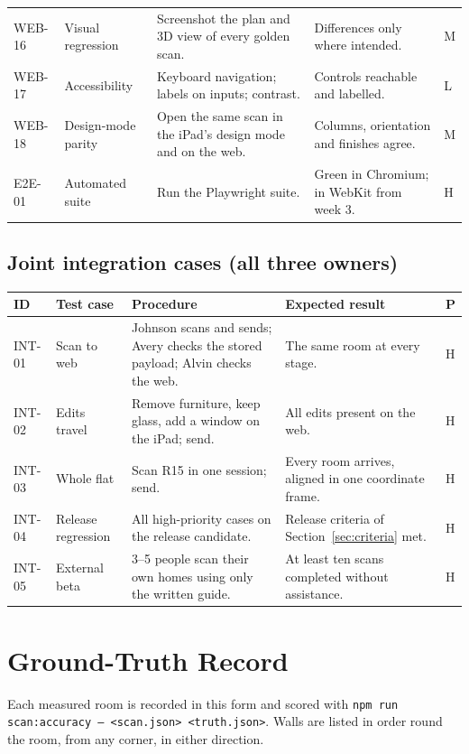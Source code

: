 \documentclass[conference,a4paper,10pt]{IEEEtran}
\begin{document}
\begin{longtable}{@{}L{1.25cm}L{3.6cm}L{5.4cm}L{5.1cm}C{0.4cm}@{}}
WEB-16 & Visual regression & Screenshot the plan and 3D view of every golden scan. & Differences only where intended. & M \\
WEB-17 & Accessibility & Keyboard navigation; labels on inputs; contrast. & Controls reachable and labelled. & L \\
WEB-18 & Design-mode parity & Open the same scan in the iPad's design mode and on the web. & Columns, orientation and finishes agree. & M \\
E2E-01 & Automated suite & Run the Playwright suite. & Green in Chromium; in WebKit from week 3. & H \\
\end{longtable}

\subsection{Joint integration cases (all three owners)}

\begin{longtable}{@{}L{1.25cm}L{3.6cm}L{5.4cm}L{5.1cm}C{0.4cm}@{}}
\toprule
ID & Test case & Procedure & Expected result & P \\
\midrule
\endhead
\bottomrule
\endfoot
INT-01 & Scan to web & Johnson scans and sends; Avery checks the stored payload; Alvin checks the web. & The same room at every stage. & H \\
INT-02 & Edits travel & Remove furniture, keep glass, add a window on the iPad; send. & All edits present on the web. & H \\
INT-03 & Whole flat & Scan R15 in one session; send. & Every room arrives, aligned in one coordinate frame. & H \\
INT-04 & Release regression & All high-priority cases on the release candidate. & Release criteria of Section~\ref{sec:criteria} met. & H \\
INT-05 & External beta & 3--5 people scan their own homes using only the written guide. & At least ten scans completed without assistance. & H \\
\end{longtable}

\normalsize

\section{Ground-Truth Record}\label{app:truth}

Each measured room is recorded in this form and scored with
\texttt{npm run scan:accuracy -- <scan.json> <truth.json>}. Walls are listed in
order round the room, from any corner, in either direction.
\end{document}

